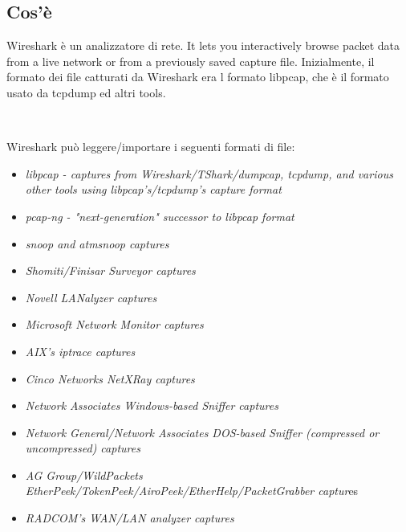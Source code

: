 \documentclass[a4paper,11pt]{book}
\begin{document}
\subsection{Cos'è}
Wireshark è un analizzatore di rete. It lets you interactively browse packet data from a live network or from a previously saved capture file. Inizialmente, il formato dei file catturati da Wireshark era l formato libpcap, che è il formato usato da tcpdump ed altri tools.

~

Wireshark può leggere/importare i seguenti formati di file:
\begin{itemize}
\item \textit{libpcap - captures from Wireshark/TShark/dumpcap, tcpdump, and various other tools using libpcap's/tcpdump's capture format}
\item \textit{pcap-ng - "next-generation" successor to libpcap format}
\item \textit{snoop and atmsnoop captures}
\item \textit{Shomiti/Finisar Surveyor captures}
\item \textit{Novell LANalyzer captures}
\item \textit{Microsoft Network Monitor captures}
\item \textit{AIX's iptrace captures}
\item \textit{Cinco Networks NetXRay captures}
\item \textit{Network Associates Windows-based Sniffer captures}
\item \textit{Network General/Network Associates DOS-based Sniffer (compressed or uncompressed) captures}
\item \textit{AG Group/WildPackets EtherPeek/TokenPeek/AiroPeek/EtherHelp/PacketGrabber captur}es
\item \textit{RADCOM's WAN/LAN analyzer captures}


\end{itemize}
\end{document}
